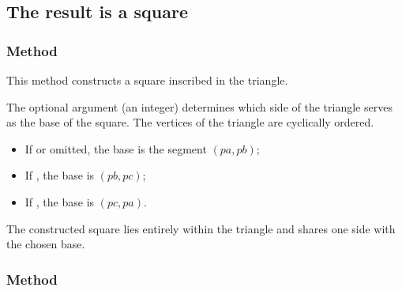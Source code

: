 

\subsection{The result is a square}

\subsubsection{Method }
\label{ssub:method_triangle_square__inscribed}

This method constructs a square inscribed in the triangle.

\medskip

The optional argument  (an integer) determines which side of the triangle serves as the base of the square. The vertices of the triangle are cyclically ordered.

\begin{itemize}
  \item If  or omitted, the base is the segment $(pa, pb)$;
  \item If , the base is $(pb, pc)$;
  \item If , the base is $(pc, pa)$.
\end{itemize}


The constructed square lies entirely within the triangle and shares one side with the chosen base.

\vspace{1em}

\begin{tkzexample}[latex=.5\textwidth]
\end{tkzexample}


\subsubsection{Method }
\label{ssub:method_tkzmeth_triangle_path}

